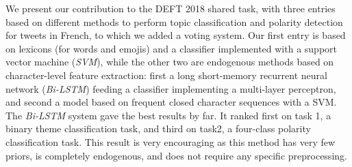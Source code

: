
We present our contribution to the DEFT 2018 shared task, with three entries based on different methods to perform topic classification and polarity detection for tweets in French, to which we added a voting system.
Our first entry is based on lexicons (for words and emojis) and a classifier implemented with a support vector machine (\textit{SVM}), while the other two are endogenous methods based on character-level feature extraction: first a long short-memory recurrent neural network (\textit{Bi-LSTM}) feeding a classifier implementing a multi-layer perceptron, and second a model based on frequent closed character sequences with a SVM.
The \textit{Bi-LSTM} system gave the best results by far.
It ranked first on task 1, a binary theme classification task, and third on task2, a four-class polarity classification task.
This result is very encouraging as this method has very few priors, is completely endogenous, and does not require any specific preprocessing.


